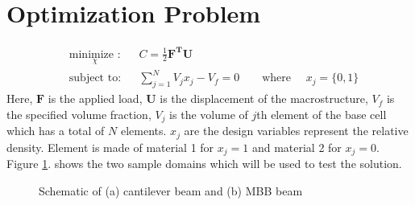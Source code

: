 \documentclass[openright,twoside]{iitkthesis}
\begin{document}
\section{Optimization Problem}
\begin{equation}
\label{eq:2dopt}
\begin{aligned}
& \underset{\chi}{\text{minimize :}}
& &  C = \frac{1}{2}\textbf{F}^\textbf{T}\textbf{U}\\
& \text{subject to:}
& & \sum_{j=1}^N V_j x_j - V_f = 0 \qquad \text{where }\quad x_j = \{0, 1\}
\end{aligned}
\end{equation}
Here, $\textbf{F}$ is the applied load, $\textbf{U}$ is the displacement of the macrostructure, $V_f$ is the specified volume fraction, $V_j$ is the volume of $j$th element of the base cell which has a total of $N$ elements. $x_j$ are the design variables represent the relative density. Element is made of material 1 for $x_j=1$ and material 2 for $x_j=0$. Figure \ref{fig:cantilever}. shows the two sample domains which will be used to test the solution.

\begin{figure}[H]
\begin{center}
\caption{Schematic of (a) cantilever beam and (b) MBB beam\cite{huang2013topology}
}
\label{fig:cantilever}
\end{center}
\end{figure}
\end{document}
